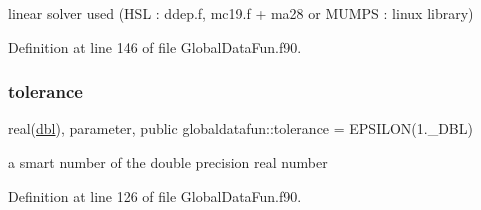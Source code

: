linear solver used (H\+SL \+: ddep.\+f, mc19.\+f + ma28 or M\+U\+M\+PS \+: linux library) 



Definition at line 146 of file Global\+Data\+Fun.\+f90.

\mbox{\label{namespaceglobaldatafun_a163afcd0caf3537efef266782e451784}} 
\subsubsection{\texorpdfstring{tolerance}{tolerance}}
{\footnotesize\ttfamily real(\hyperlink{namespaceglobaldatafun_a5008801201dd34f2af8eae07756befb4}{dbl}), parameter, public globaldatafun\+::tolerance = E\+P\+S\+I\+L\+ON(1.\+\_\+\+D\+B\+L)}



a smart number of the double precision real number 



Definition at line 126 of file Global\+Data\+Fun.\+f90.

